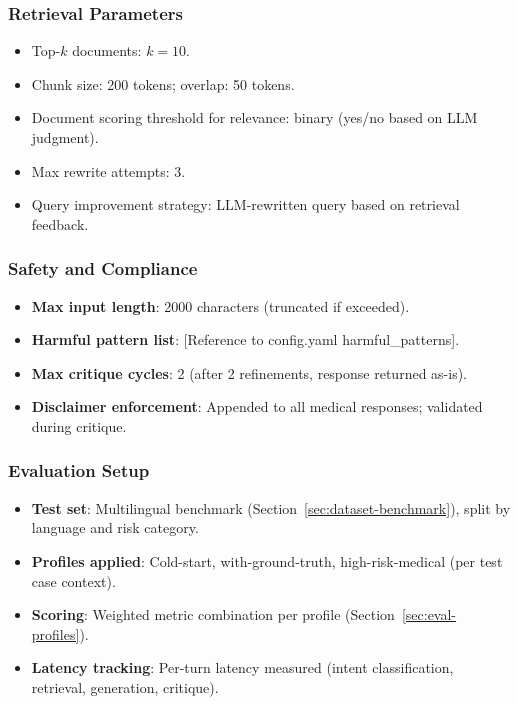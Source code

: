 \documentclass[11pt,a4paper]{article}
\begin{document}
\subsubsection{Retrieval Parameters}
\begin{itemize}
    \item Top-$k$ documents: $k = 10$.
    \item Chunk size: 200 tokens; overlap: 50 tokens.
    \item Document scoring threshold for relevance: binary (yes/no based on LLM judgment).
    \item Max rewrite attempts: 3.
    \item Query improvement strategy: LLM-rewritten query based on retrieval feedback.
\end{itemize}

\subsubsection{Safety and Compliance}
\begin{itemize}
    \item \textbf{Max input length}: 2000 characters (truncated if exceeded).
    \item \textbf{Harmful pattern list}: [Reference to config.yaml harmful\_patterns].
    \item \textbf{Max critique cycles}: 2 (after 2 refinements, response returned as-is).
    \item \textbf{Disclaimer enforcement}: Appended to all medical responses; validated during critique.
\end{itemize}

\subsubsection{Evaluation Setup}
\begin{itemize}
    \item \textbf{Test set}: Multilingual benchmark (Section~\ref{sec:dataset-benchmark}), split by language and risk category.
    \item \textbf{Profiles applied}: Cold-start, with-ground-truth, high-risk-medical (per test case context).
    \item \textbf{Scoring}: Weighted metric combination per profile (Section~\ref{sec:eval-profiles}).
    \item \textbf{Latency tracking}: Per-turn latency measured (intent classification, retrieval, generation, critique).
\end{itemize}
\end{document}
